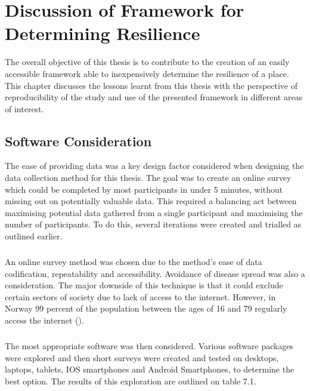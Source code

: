 
\chapter{Discussion of Framework for Determining Resilience}

The overall objective of this thesis is to contribute to the creation of an easily accessible framework able to inexpensively determine the resilience of a place. This chapter discusses the lessons learnt from this thesis with the perspective of reproducibility of the study and use of the presented framework in different areas of interest.

\section{Software Consideration}
The ease of providing data was a key design factor considered when designing the data collection method for this thesis. The goal was to create an online survey which could be completed by most participants in under 5 minutes, without missing out on potentially valuable data. This required a balancing act between maximising potential data gathered from a single participant and maximising the number of participants. To do this, several iterations were created and trialled as outlined earlier.
\paragraph{}
An online survey method was chosen due to the method's ease of data codification, repeatability and accessibility. Avoidance of disease spread was also a consideration. The major downside of this technique is that it could exclude certain sectors of society due to lack of access to the internet. However, in Norway 99 percent of the population between the ages of 16 and 79 regularly access the internet (\cite{walther-zhang_ict_2022}). 
\paragraph{}
The most appropriate software was then considered.  Various software packages were explored and then short surveys were created and  tested on desktops, laptops, tablets, IOS smartphones and Android Smartphones, to determine the best option. The results of this exploration are outlined on table 7.1.

